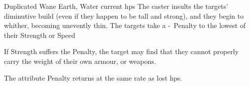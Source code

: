   {Duplicated}%
  {Wane}%
  {Earth, Water}%
  {current \glspl{hp}}%
  {The caster insults the targets' diminutive build (even if they happen to be tall and strong), and they begin to whither, becoming unevently thin.
    The targets take a -~Penalty to the lowest of their Strength or Speed}%
  {If Strength suffers the Penalty, the target may find that they cannot properly carry the weight of their own armour, or weapons.

    The \gls{attribute} Penalty returns at the same rate as lost \glspl{hp}.}

